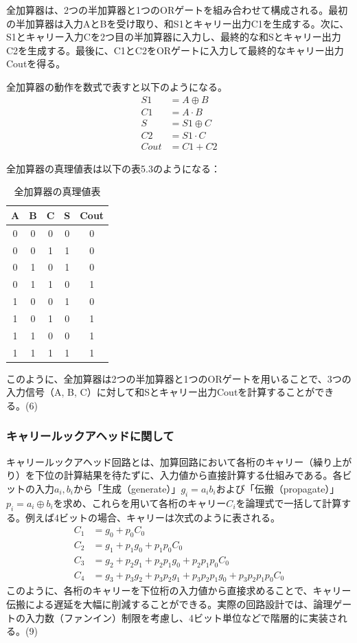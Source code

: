 \documentclass{jlreq}
\numberwithin{equation}{section}
\begin{document}
全加算器は、2つの半加算器と1つのORゲートを組み合わせて構成される。最初の半加算器は入力AとBを受け取り、和S1とキャリー出力C1を生成する。次に、S1とキャリー入力Cを2つ目の半加算器に入力し、最終的な和Sとキャリー出力C2を生成する。最後に、C1とC2をORゲートに入力して最終的なキャリー出力Coutを得る。

全加算器の動作を数式で表すと以下のようになる。
\begin{align}
  S1 &= A \oplus B \\
  C1 &= A \cdot B \\
  S &= S1 \oplus C \\
  C2 &= S1 \cdot C \\
  Cout &= C1 + C2
\end{align}

全加算器の真理値表は以下の表5.3のようになる：
\begin{table}[H]
  \centering
  \caption{全加算器の真理値表}
  \begin{tabular}{|c|c|c|c|c|}
    \hline
    A & B & C & S & Cout \\ \hline
    0 & 0 & 0 & 0 & 0 \\ \hline
    0 & 0 & 1 & 1 & 0 \\ \hline
    0 & 1 & 0 & 1 & 0 \\ \hline
    0 & 1 & 1 & 0 & 1 \\ \hline
    1 & 0 & 0 & 1 & 0 \\ \hline
    1 & 0 & 1 & 0 & 1 \\ \hline
    1 & 1 & 0 & 0 & 1 \\ \hline
    1 & 1 & 1 & 1 & 1 \\ \hline
  \end{tabular}
\end{table}

このように、全加算器は2つの半加算器と1つのORゲートを用いることで、3つの入力信号（A, B, C）に対して和Sとキャリー出力Coutを計算することができる。(6)

\subsubsection{キャリールックアヘッドに関して}

キャリールックアヘッド回路とは、加算回路において各桁のキャリー（繰り上がり）を下位の計算結果を待たずに、入力値から直接計算する仕組みである。各ビットの入力$a_i, b_i$から「生成（generate）」$g_i = a_i b_i$および「伝搬（propagate）」$p_i = a_i \oplus b_i$を求め、これらを用いて各桁のキャリー$C_i$を論理式で一括して計算する。例えば4ビットの場合、キャリーは次式のように表される。
\begin{align*}
C_1 &= g_0 + p_0 C_0 \\
C_2 &= g_1 + p_1 g_0 + p_1 p_0 C_0 \\
C_3 &= g_2 + p_2 g_1 + p_2 p_1 g_0 + p_2 p_1 p_0 C_0 \\
C_4 &= g_3 + p_3 g_2 + p_3 p_2 g_1 + p_3 p_2 p_1 g_0 + p_3 p_2 p_1 p_0 C_0
\end{align*}
このように、各桁のキャリーを下位桁の入力値から直接求めることで、キャリー伝搬による遅延を大幅に削減することができる。実際の回路設計では、論理ゲートの入力数（ファンイン）制限を考慮し、4ビット単位などで階層的に実装される。(9)
\end{document}
